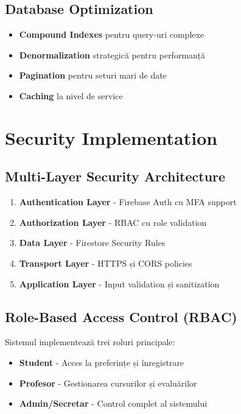 \documentclass[11pt,a4paper]{article}
\begin{document}
\subsection{Database Optimization}

\begin{itemize}
    \item \textbf{Compound Indexes} pentru query-uri complexe
    \item \textbf{Denormalization} strategică pentru performanță
    \item \textbf{Pagination} pentru seturi mari de date
    \item \textbf{Caching} la nivel de service
\end{itemize}

\section{Security Implementation}

\subsection{Multi-Layer Security Architecture}

\begin{enumerate}
    \item \textbf{Authentication Layer} - Firebase Auth cu MFA support
    \item \textbf{Authorization Layer} - RBAC cu role validation
    \item \textbf{Data Layer} - Firestore Security Rules
    \item \textbf{Transport Layer} - HTTPS și CORS policies
    \item \textbf{Application Layer} - Input validation și sanitization
\end{enumerate}

\subsection{Role-Based Access Control (RBAC)}

Sistemul implementează trei roluri principale:
\begin{itemize}
    \item \textbf{Student} - Acces la preferințe și înregistrare
    \item \textbf{Profesor} - Gestionarea cursurilor și evaluărilor
    \item \textbf{Admin/Secretar} - Control complet al sistemului
\end{itemize}
\end{document}
